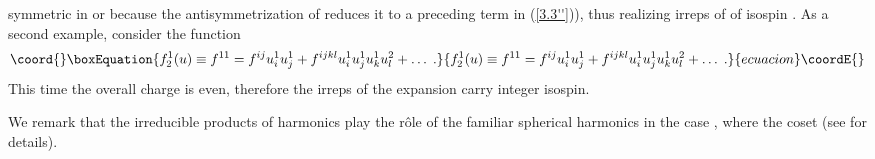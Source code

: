 \documentclass[a4paper,12pt]{article}
\begin{document}
symmetric in \coordHE{} or because the antisymmetrization of 
\coordHE{} reduces it to a preceding term in (\ref{3.3''})), 
thus realizing irreps of \coordHE{} of isospin \coordHE{}. As a 
second example, consider the function 
\begin{equation}\coord{}\boxEquation{\label{3.3'''}
  f^1_2(u) \equiv f^{11} = f^{ij}u^1_i u^1_j + f^{ijkl}u^1_i u^1_ju^1_k 
u^2_l + \ldots\;.
}{f^1_2(u) \equiv f^{11} = f^{ij}u^1_i u^1_j + f^{ijkl}u^1_i u^1_ju^1_k 
u^2_l + \ldots\;.
}{ecuacion}\coordE{}\end{equation}
This time the overall charge is even, therefore the irreps of the 
expansion carry integer isospin. 
 
We remark that the irreducible products of harmonics play the r\^{o}le 
of the familiar spherical harmonics in the case \coordHE{}, where the 
coset \coordHE{} (see \cite{GIK1} for 
details).  
\end{document}
